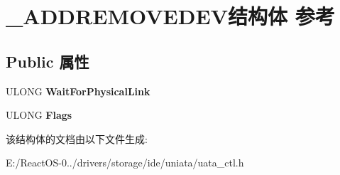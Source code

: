 \hypertarget{struct___a_d_d_r_e_m_o_v_e_d_e_v}{}\section{\+\_\+\+A\+D\+D\+R\+E\+M\+O\+V\+E\+D\+E\+V结构体 参考}
\label{struct___a_d_d_r_e_m_o_v_e_d_e_v}
\subsection*{Public 属性}
\begin{DoxyCompactItemize}
\item 
\mbox{\label{struct___a_d_d_r_e_m_o_v_e_d_e_v_ac128789d6a12ccf7af5d80610255b35e}} 
U\+L\+O\+NG {\bfseries Wait\+For\+Physical\+Link}
\item 
\mbox{\label{struct___a_d_d_r_e_m_o_v_e_d_e_v_ab09417570e3aa0ceab6be6185cc7a77a}} 
U\+L\+O\+NG {\bfseries Flags}
\end{DoxyCompactItemize}


该结构体的文档由以下文件生成\+:\begin{DoxyCompactItemize}
\item 
E\+:/\+React\+O\+S-\/0../drivers/storage/ide/uniata/uata\+\_\+ctl.\+h\end{DoxyCompactItemize}
